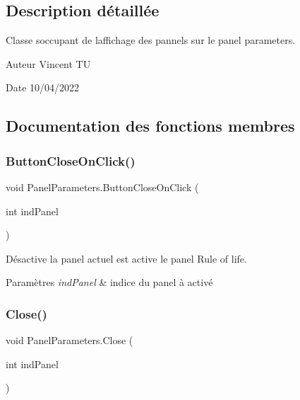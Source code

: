 \subsection{Description détaillée}
Classe s\textquotesingle{}occupant de l\textquotesingle{}affichage des pannels sur le panel parameters. 

\begin{DoxyAuthor}{Auteur}
Vincent TU 
\end{DoxyAuthor}
\begin{DoxyDate}{Date}
10/04/2022 
\end{DoxyDate}


\subsection{Documentation des fonctions membres}
\mbox{\label{class_panel_parameters_aa39f1cebfe55f942b67b3c5c85d89fe8}} 
\subsubsection{\texorpdfstring{Button\+Close\+On\+Click()}{ButtonCloseOnClick()}}
{\footnotesize\ttfamily void Panel\+Parameters.\+Button\+Close\+On\+Click (\begin{DoxyParamCaption}\item[{int}]{ind\+Panel }\end{DoxyParamCaption})\hspace{0.3cm}{\ttfamily [inline]}}



Désactive la panel actuel est active le panel Rule of life. 


\begin{DoxyParams}{Paramètres}
{\em ind\+Panel} & indice du panel à activé\\
\hline
\end{DoxyParams}
\mbox{\label{class_panel_parameters_a649a132c50df46f39a340b3668bddda1}} 
\subsubsection{\texorpdfstring{Close()}{Close()}}
{\footnotesize\ttfamily void Panel\+Parameters.\+Close (\begin{DoxyParamCaption}\item[{int}]{ind\+Panel }\end{DoxyParamCaption})\hspace{0.3cm}{\ttfamily [inline]}}




